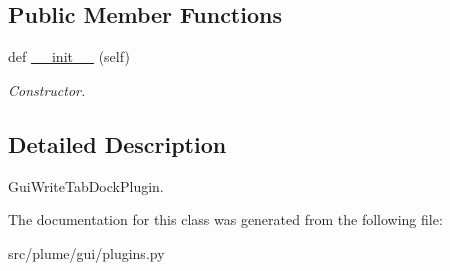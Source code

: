 \subsection*{Public Member Functions}
\begin{DoxyCompactItemize}
\item 
def \hyperlink{classplume-creator_1_1src_1_1plume_1_1gui_1_1plugins_1_1_gui_write_panel_dock_plugin_ac862ae33700d8c11d5fb1417aa7661dd}{\+\_\+\+\_\+init\+\_\+\+\_\+} (self)\hypertarget{classplume-creator_1_1src_1_1plume_1_1gui_1_1plugins_1_1_gui_write_panel_dock_plugin_ac862ae33700d8c11d5fb1417aa7661dd}{}\label{classplume-creator_1_1src_1_1plume_1_1gui_1_1plugins_1_1_gui_write_panel_dock_plugin_ac862ae33700d8c11d5fb1417aa7661dd}

\begin{DoxyCompactList}\small\item\em Constructor. \end{DoxyCompactList}\end{DoxyCompactItemize}


\subsection{Detailed Description}
Gui\+Write\+Tab\+Dock\+Plugin. 

The documentation for this class was generated from the following file\+:\begin{DoxyCompactItemize}
\item 
src/plume/gui/plugins.\+py\end{DoxyCompactItemize}
